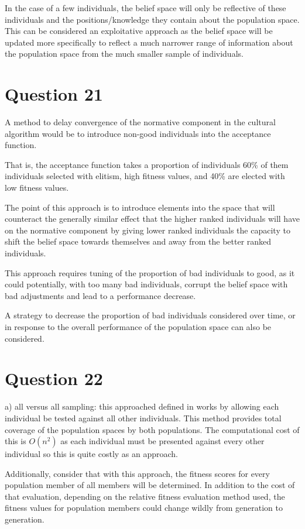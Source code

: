 \documentclass[12pt]{article}
\begin{document}
	In the case of a few individuals, the belief space will only be reflective of these individuals and the positions/knowledge they contain about the population space. This can be considered an exploitative approach as the belief space will be updated more specifically to reflect a much narrower range of information about the population space from the much smaller sample of individuals.
\section{Question 21}
A method to delay convergence of the normative component in the cultural algorithm would be to introduce non-good individuals into the acceptance function.

That is, the acceptance function takes a proportion of individuals 60\% of them individuals selected with elitism, high fitness values, and 40\% are elected with low fitness values.

The point of this approach is to introduce elements into the space that will counteract the generally similar effect that the higher ranked individuals will have on the normative component by giving lower ranked individuals the capacity to shift the belief space towards themselves and away from the better ranked individuals.

This approach requires tuning of the proportion of bad individuals to good, as it could potentially, with too many bad individuals, corrupt the belief space with bad adjustments and lead to a performance decrease.

A strategy to decrease the proportion of bad individuals considered over time, or in response to the overall performance of the population space can also be considered.
\section{Question 22}
a) all versus all sampling: this approached defined in \cite{axelrod-1987b} works by allowing each individual be tested against all other individuals. This method provides total coverage of the population spaces by both populations. The computational cost of this is $O(n^2)$ as each individual must be presented against every other individual so this is quite costly as an approach.

	Additionally, consider that with this approach, the fitness scores for every population member of all members will be determined. In addition to the cost of that evaluation, depending on the relative fitness evaluation method used, the fitness values for population members could change wildly from generation to generation. 
\end{document}
